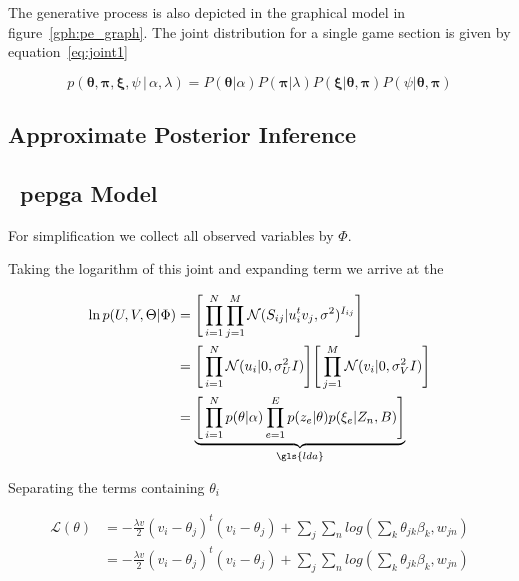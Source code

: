 
The generative process is also depicted in the graphical model in figure~\ref{gph:pe_graph}. The joint distribution for a single game section is given by equation~\ref{eq:joint1}

\begin{equation}
p(\boldsymbol\theta, \boldsymbol\pi, \boldsymbol\xi, \psi \, | \, \alpha, \lambda) = P(\boldsymbol\theta|\alpha) P(\boldsymbol\pi|\lambda)P(\boldsymbol\xi|\boldsymbol\theta, \boldsymbol\pi)P(\psi|\boldsymbol\theta, \boldsymbol\pi)
\label{eq:joint1}
\end{equation}



\subsection{Approximate Posterior Inference}




\subsection{~\glsdesc{pepga} Model}



For simplification we collect all observed variables by $\Phi$.

Taking the logarithm of this joint and expanding term we arrive at the 


\begin{align*}
\ln{p(U,V,\Theta|\Phi)} &= \Bigg[\prod_{i=1}^{N}\prod_{j=1}^{M}\mathcal{N}(S_{ij}|u_{i}^{t}v_{j}, \sigma^2)^{I_{ij}} \Bigg] \\
&=\Bigg[\prod_{i=1}^{N} \mathcal{N}(u_{i}|0,\sigma^{2}_{U}I) \Bigg] \Bigg[\prod_{j=1}^{M} \mathcal{N}(v_{i}|0,\sigma^{2}_{V}I) \Bigg] \\
&=\underbrace{\Bigg[\prod_{i=1}^{N} p(\theta|\alpha) \prod_{e=1}^{E}  p(z_{e}|\theta)p(\xi_{e}|Z_{n},B)\Bigg]}_{\gls{lda}}
\end{align*}

Separating the terms containing $\theta_{i}$

\begin{align*}
    \mathcal{L}(\theta) &= -\frac{\lambda v}{2} (v_{i} - \theta_{j})^{t}(v_{i} - \theta_{j}) + \sum_{j}\sum_{n}log(\sum_{k}\theta_{jk}\beta_{k},w_{jn}) \\
    &= -\frac{\lambda v}{2} (v_{i} - \theta_{j})^{t}(v_{i} - \theta_{j}) + \sum_{j}\sum_{n}log(\sum_{k}\theta_{jk}\beta_{k},w_{jn})
\end{align*}